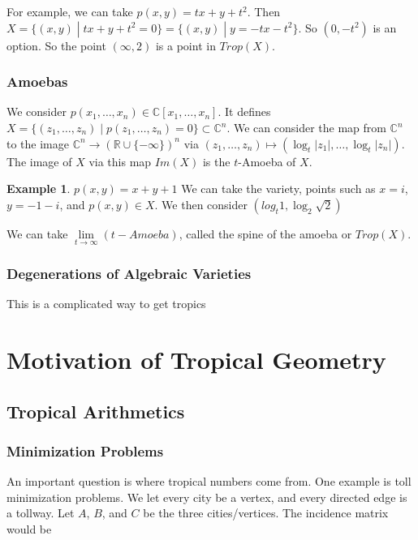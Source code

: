 \documentclass[12pt]{memoir}
\theoremstyle{definition}
\newtheorem{protoexample}{Example}[section]
\newenvironment{ex}
   {\begin{protoexample}}
   {\end{protoexample}}
\def\RR{{\mathbb R}}
\def\CC{{\mathbb C}}
\begin{document}
For example, we can take $p(x,y) = tx + y + t^2$. Then $X = \{ (x,y) \; |\; tx+y+t^2 = 0\}= \{ (x,y) \; |\; y = -tx -t^2\} $. So $(0,-t^2)$ is an option. So the point $(\infty, 2)$ is a point in $Trop(X)$.



\subsubsection{Amoebas}

We consider $p(x_1, \dots, x_n) \in \CC[x_1, \dots, x_n]$. It defines $ X= \{(z_1, \dots, z_n) \; |\; p(z_1, \dots, z_n) = 0 \} \subset \CC^n$. We can consider the map  from $\CC^n$ to the image $\CC^n  \rightarrow  (\RR \cup \{-\infty\})^n$ via $(z_1, \dots, z_n) \mapsto (\log_t|z_1|, \dots, \log_t |z_n|) $. The image of $X$ via this map $Im(X)$ is the $t$-Amoeba of $X$. 


\begin{ex}
    $p(x,y) = x+y+1$ We can take the variety, points such as $x=i$, $y=-1-i$, and $p(x,y) \in X$. We then consider $(log_t 1, \log_2 \sqrt{2})$
\end{ex}


We can take $\lim\limits_{t \rightarrow \infty} (t-Amoeba)$, called the spine of the amoeba or $Trop(X)$.


\subsubsection{Degenerations of Algebraic Varieties}



This is a complicated way to get tropics



\section{Motivation of Tropical Geometry}

\subsection{Tropical Arithmetics}

\subsubsection{Minimization Problems}

An important question is where tropical numbers come from. One example is toll minimization problems. We let every city be a vertex, and every directed edge is a tollway. Let $A$, $B$, and $C$ be the three cities/vertices. The incidence matrix would be
\end{document}
